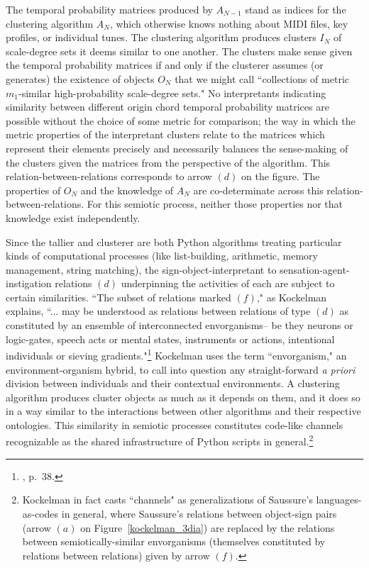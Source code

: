 The temporal probability matrices produced by $A_{N-1}$ stand as indices for the clustering algorithm $A_{N}$, which otherwise knows nothing about MIDI files, key profiles, or individual tunes.  The clustering algorithm produces clusters $I_{N}$ of scale-degree sets it deems similar to one another.  The clusters make sense given the temporal probability matrices if and only if the clusterer assumes (or generates) the existence of objects $O_N$ that we might call ``collections of metric $m_1$-similar high-probability scale-degree sets."  No interpretants indicating similarity between different origin chord temporal probability matrices are possible without the choice of some metric for comparison; the way in which the metric properties of the interpretant clusters relate to the matrices which represent their elements precisely and necessarily balances the sense-making of the clusters given the matrices from the perspective of the algorithm.  This relation-between-relations corresponds to arrow $(d)$ on the figure.  The properties of $O_N$ and the knowledge of $A_N$ are co-determinate across this relation-between-relations.  For this semiotic process, neither those properties nor that knowledge exist independently.

Since the tallier and clusterer are both Python algorithms treating particular kinds of computational processes (like list-building, arithmetic, memory management, string matching), the sign-object-interpretant to sensation-agent-instigation relations $(d)$ underpinning the activities of each are subject to certain similarities.  ``The subset of relations marked $(f)$," as Kockelman explains, ``... may be understood as relations between relations of type $(d)$ as constituted by an ensemble of interconnected envorganisms-- be they neurons or logic-gates, speech acts or mental states, instruments or actions, intentional individuals or sieving gradients."\footnote{\cite{kockelman2013}, p.\ 38.}  Kockelman uses the term ``envorganism," an environment-organism hybrid, to call into question any straight-forward \emph{a priori} division between individuals and their contextual environments.  A clustering algorithm produces cluster objects as much as it depends on them, and it does so in a way similar to the interactions between other algorithms and their respective ontologies.  This similarity in semiotic processes constitutes code-like channels recognizable as the shared infrastructure of Python scripts in general.\footnote{Kockelman in fact casts ``channels" as generalizations of Saussure's languages-as-codes in general, where Saussure's relations between object-sign pairs (arrow $(a)$ on Figure~\ref{kockelman_3dia}) are replaced by the relations between semiotically-similar envorganisms (themselves constituted by relations between relations) given by arrow $(f)$.}

